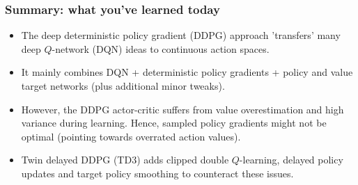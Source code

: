 \begin{frame}
\frametitle{Summary: what you've learned today}
\begin{itemize}
	\item The deep deterministic policy gradient (DDPG) approach 'transfers' many deep $Q$-network (DQN) ideas to continuous action spaces.\pause
	\item It mainly combines DQN + deterministic policy gradients + policy and value target networks (plus additional minor tweaks).\pause
	\item However, the DDPG actor-critic suffers from value overestimation and high variance during learning. Hence, sampled policy gradients might not be optimal (pointing towards overrated action values).\pause
	\item Twin delayed DDPG (TD3) adds clipped double $Q$-learning, delayed policy updates and target policy smoothing to counteract these issues.
\end{itemize}
\end{frame}
